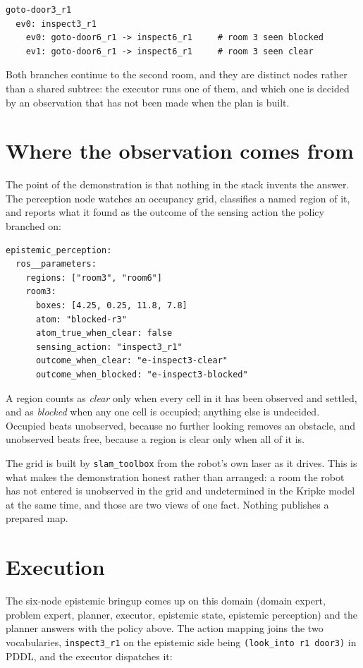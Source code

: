 \documentclass[11pt,a4paper]{article}
\theoremstyle{definition}
\newcommand{\code}[1]{\texttt{\small #1}}
\begin{document}
\begin{lstlisting}
goto-door3_r1
  ev0: inspect3_r1
    ev0: goto-door6_r1 -> inspect6_r1     # room 3 seen blocked
    ev1: goto-door6_r1 -> inspect6_r1     # room 3 seen clear
\end{lstlisting}

Both branches continue to the second room, and they are distinct nodes rather
than a shared subtree: the executor runs one of them, and which one is decided
by an observation that has not been made when the plan is built.

\section{Where the observation comes from}

The point of the demonstration is that nothing in the stack invents the answer.
The perception node watches an occupancy grid, classifies a named region of it,
and reports what it found as the outcome of the sensing action the policy
branched on:

\begin{lstlisting}
epistemic_perception:
  ros__parameters:
    regions: ["room3", "room6"]
    room3:
      boxes: [4.25, 0.25, 11.8, 7.8]
      atom: "blocked-r3"
      atom_true_when_clear: false
      sensing_action: "inspect3_r1"
      outcome_when_clear: "e-inspect3-clear"
      outcome_when_blocked: "e-inspect3-blocked"
\end{lstlisting}

A region counts as \emph{clear} only when every cell in it has been observed and
settled, and as \emph{blocked} when any one cell is occupied; anything else is
undecided. Occupied beats unobserved, because no further looking removes an
obstacle, and unobserved beats free, because a region is clear only when all of
it is.

The grid is built by \code{slam\_toolbox} from the robot's own laser as it
drives. This is what makes the demonstration honest rather than arranged: a room
the robot has not entered is unobserved in the grid and undetermined in the
Kripke model at the same time, and those are two views of one fact. Nothing
publishes a prepared map.

\section{Execution}

The six-node epistemic bringup comes up on this domain (domain expert,
problem expert, planner, executor, epistemic state, epistemic perception)
and the planner answers with the policy above. The action mapping joins the two
vocabularies, \code{inspect3\_r1} on the epistemic side being
\code{(look\_into r1 door3)} in PDDL, and the executor dispatches it:
\end{document}
